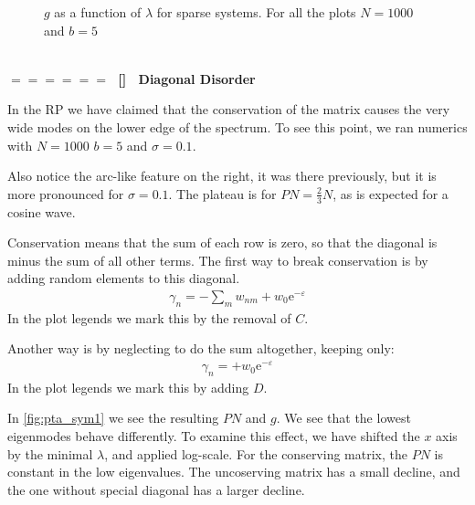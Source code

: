 \documentclass[onecolumn,fleqn,longbibliography]{revtex4}
\newcommand{\eexp}{\mbox{e}^}
\newcommand{\sect}[1]
{
\addtocounter{section}{1} 
\setcounter{subsection}{0}
\ \\ 
\pdfbookmark[2]{\thesection. \ #1}{sect.\thesection}
{\Large\bf $=\!=\!=\!=\!=\!=\;$ [\thesection] \ #1}  
\nopagebreak
}
\begin{document}
\begin{figure}[H]
{  }
  \caption{$g$ as a function of $\lambda$ for sparse systems.
  For all the plots $N=1000$ and $b=5$}
\end{figure}

\sect{Diagonal Disorder}


In the RP we have claimed that the conservation of the matrix
causes the very wide modes on the lower edge of the spectrum.
To see this point, we ran numerics with $N=1000$ $b=5$ and $\sigma=0.1$.

 Also notice the arc-like feature on the right,
it was there previously, but it is more pronounced for $\sigma=0.1$.  
The plateau is for $PN=\frac{2}{3}N$, as is expected for a cosine wave. 


Conservation means that the sum of each row is zero, so that the diagonal is minus the
sum of all other terms. The first way to break conservation is by adding
random elements to this diagonal.
\begin{align}
\gamma_n = -\sum_m w_{nm} + w_0\eexp{-\varepsilon}
\end{align}
 In the plot legends we mark this by the removal of $C$.
 
 
Another way is by neglecting to do the sum altogether,
keeping only:
\begin{align}
\gamma_n = + w_0\eexp{-\varepsilon}
\end{align}
In the plot legends we mark this by adding $D$.



In \autoref{fig:pta_sym1} we see the resulting $PN$ and $g$. We see
that the lowest eigenmodes behave differently. To examine this effect,
we have shifted the $x$ axis by the minimal $\lambda$, and applied log-scale.
For the conserving matrix, the $PN$ is constant in the low eigenvalues. The
uncoserving matrix has a small decline, and the one without special diagonal 
has a larger decline. 
\end{document}
